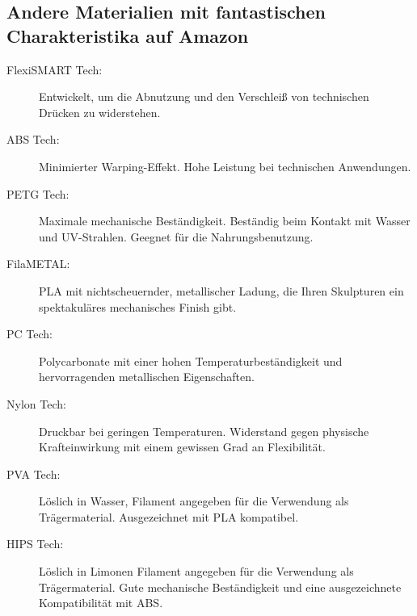 \documentclass[11pt,a4paper]{article}
\begin{document}
\subsection{Andere Materialien mit fantastischen Charakteristika auf Amazon}
\begin{description}
\item[FlexiSMART Tech:] Entwickelt, um die Abnutzung und den Verschleiß von technischen Drücken zu widerstehen.
\item[ABS Tech:] Minimierter Warping-Effekt. Hohe Leistung bei technischen Anwendungen.
\item[PETG Tech:] Maximale mechanische Beständigkeit. Beständig beim Kontakt mit Wasser und UV-Strahlen. Geegnet für die Nahrungsbenutzung.
\item[FilaMETAL:] PLA mit nichtscheuernder, metallischer Ladung, die Ihren Skulpturen ein spektakuläres mechanisches Finish gibt.
\item[PC Tech:] Polycarbonate mit einer hohen Temperaturbeständigkeit und hervorragenden metallischen Eigenschaften.
\item[Nylon Tech:] Druckbar bei geringen Temperaturen. Widerstand gegen physische Krafteinwirkung mit einem gewissen Grad an Flexibilität.
\item[PVA Tech:] Löslich in Wasser, Filament angegeben für die Verwendung als Trägermaterial. Ausgezeichnet mit PLA kompatibel.
\item[HIPS Tech:] Löslich in Limonen Filament angegeben für die Verwendung als Trägermaterial. Gute mechanische Beständigkeit und eine ausgezeichnete Kompatibilität mit ABS.
\end{description}

\end{document}
